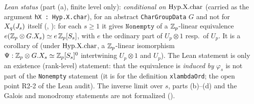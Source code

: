\noindent\emph{Lean status} (part (a), finite level only): \stformal{} \emph{conditional on} $\mathrm{Hyp.X.char}$ (carried as the argument \texttt{hX : Hyp.X.char}), for an abstract \texttt{CharGroupData} $G$ and not for $X_q(J_s)$ itself (, ): for each $s\ge1$ it gives $\mathtt{Nonempty}$ of a $\mathbb{Z}_p$-linear equivalence $e(\mathbb{Z}_p\otimes G.X_s)\simeq e\,\mathbb{Z}_p[S_s]$, with $e$ the ordinary part of $U_p\otimes1$ resp.\ of $U_p$. It is a corollary of  (under $\mathrm{Hyp.X.char}$, a $\mathbb{Z}_p$-linear isomorphism $\Psi:\mathbb{Z}_p\otimes G.X_s\simeq\mathbb{Z}_p[S_s]^0$ intertwining $U_p\otimes1$ and $U_p$). The Lean statement is only an existence (rank-level) statement: that the equivalence is \emph{induced by} $\varphi_s$ is not part of the \texttt{Nonempty} statement (it is for the definition \texttt{xlambdaOrd}; the open point R2-2 of the Lean audit). The inverse limit over $s$, parts (b)--(d) and the Galois and monodromy statements are not formalized (\leanplanned{}).
